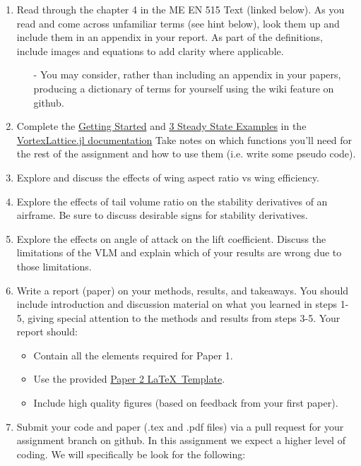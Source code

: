 \documentclass[12pt]{article}
\begin{document}
\begin{enumerate}
	\item Read  through the chapter 4 in the ME EN 515 Text (linked below).  As you read and come across unfamiliar terms (see hint below), look them up and include them in an appendix in your report.  As part of the definitions, include images and equations to add clarity where applicable.
	\begin{itemize}
		\item[-] You may consider, rather than including an appendix in your papers, producing a dictionary of terms for yourself using the wiki feature on github.
	\end{itemize}
	\item Complete the \href{https://flow.byu.edu/VortexLattice.jl/stable/guide/}{Getting Started} and \href{https://flow.byu.edu/VortexLattice.jl/stable/examples/#Steady-State-Analysis-of-a-Wing}{3 Steady State Examples} in the \href{https://flow.byu.edu/VortexLattice.jl/stable/}{VortexLattice.jl documentation} Take notes on which functions you'll need for the rest of the assignment and how to use them (i.e. write some pseudo code). 
	\item Explore and discuss the effects of wing aspect ratio vs wing efficiency. 
	\item Explore the effects of tail volume ratio on the stability derivatives of an airframe. Be sure to discuss desirable signs for stability derivatives.
	\item Explore the effects on angle of attack on the lift coefficient. Discuss the limitations of the VLM and explain which of your results are wrong due to those limitations.
	\item Write a report (paper) on your methods, results, and takeaways. You should include introduction and discussion material on what you learned in steps 1-5, giving special attention to the methods and results from steps 3-5. Your report should:
	\begin{itemize}
		\item Contain all the elements required for Paper 1.
		\item Use the provided \href{https://github.com/byuflowlab/undergrad-onboarding/tree/497R/497R/latex_templates/paper2_asme}{Paper 2 \LaTeX~Template}.
		\item Include high quality figures (based on feedback from your first paper).
	\end{itemize}
		\item Submit your code and paper (.tex and .pdf files) via a pull request for your assignment branch on github. In this assignment we expect a higher level of coding. We will specifically be look for the following: 

\end{enumerate}
\end{document}
